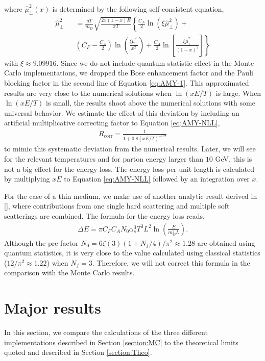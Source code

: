 \documentclass[aps, prc, reprint, amsmath, groupedaddress, nofootinbib]{revtex4-1}
\begin{document}
where $\hat{\mu}_\perp^2(x)$ is determined by the following self-consistent equation,
\begin{eqnarray}\label{eq:AMY-sf}
\nonumber
\hat{\mu}_\perp^2 && = \frac{gT}{m_D} \sqrt{\frac{2x(1-x)E}{\pi T}}\left\{\frac{C_A}{2}\ln(\xi\hat{\mu}_\perp^2) + \right. \\
&&\left.\left(C_F-\frac{C_A}{2}\right)\ln\left(\frac{\xi\hat{\mu}_\perp^2}{x^2}\right) + \frac{C_A}{2}\ln\left[\frac{\xi\hat{\mu}_\perp^2}{(1-x)^2}\right]\right\}
\end{eqnarray}
with $\xi\approx9.09916$. Since we do not include quantum statistic effect in the Monte Carlo implementations, we dropped the Bose enhancement factor and the Pauli blocking factor in the second line of Equation \ref{eq:AMY-1}.
This approximated results are very close to the numerical solutions when $\ln(xE/T)$ is large. 
When $\ln(xE/T)$ is small, the results shoot above the numerical solutions with some universal behavior.
We estimate the effect of this deviation by including an artificial multiplicative correcting factor to Equation \ref{eq:AMY-NLL}, 
\begin{eqnarray}
R_{\textrm{corr}} = \frac{1}{1+0.8\left(xE/T\right)^{-0.7}}
\end{eqnarray}
to mimic this systematic deviation from the numerical results. 
Later, we will see for the relevant temperatures and for parton energy larger than $10$ GeV, this is not a big effect for the energy loss.
The energy loss per unit length is calculated by multiplying $xE$ to Equation \ref{eq:AMY-NLL} followed by an integration over $x$.

For the case of a thin medium, we make use of another analytic result derived in [], where contributions from one single hard scattering and multiple soft scatterings are combined. The formula for the energy loss reads,
\begin{eqnarray}\label{eq:dE-thin}
\Delta E = \pi C_F C_A N_0 \alpha_s^3 T^3 L^2 \ln\left(\frac{E}{m_D^2 L}\right).
\end{eqnarray}
Although the pre-factor $N_0 = 6\zeta(3)(1+N_f/4)/\pi^2 \approx 1.28$ 
are obtained using quantum statistics, it is very close to the value calculated using classical statistics ($12/\pi^2 \approx 1.22$) when $N_f=3$.
Therefore, we will not correct this formula in the comparison with the Monte Carlo results.

\section{Major results}\label{section:results}
In this section, we compare the calculations of the three different implementations described in Section \ref{section:MC} to the theoretical limits quoted and described in Section \ref{section:Theo}. 
\end{document}
